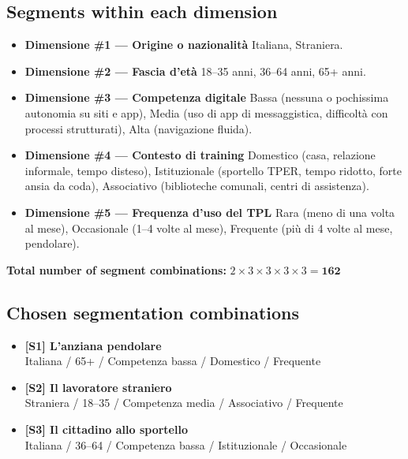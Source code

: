 \documentclass[11pt,a4paper]{article}
\begin{document}
\vspace{0.5cm}

\begin{tcolorbox}[colback=backgroundColor,colframe=borderColor,arc=2mm]
\subsection{Segments within each dimension}
\begin{itemize}[leftmargin=*,itemsep=4pt]
\item \textbf{Dimensione \#1 --- Origine o nazionalità}
    Italiana,
    Straniera.
\item \textbf{Dimensione \#2 --- Fascia d'età}
    18--35 anni,
    36--64 anni,
    65+ anni.
\item \textbf{Dimensione \#3 --- Competenza digitale}
    Bassa (nessuna o pochissima autonomia su siti e app),
    Media (uso di app di messaggistica, difficoltà con processi strutturati),
    Alta (navigazione fluida).
\item \textbf{Dimensione \#4 --- Contesto di training}
    Domestico (casa, relazione informale, tempo disteso),
    Istituzionale (sportello TPER, tempo ridotto, forte ansia da coda),
    Associativo (biblioteche comunali, centri di assistenza).
\item \textbf{Dimensione \#5 --- Frequenza d'uso del TPL}
    Rara (meno di una volta al mese),
    Occasionale (1--4 volte al mese),
    Frequente (più di 4 volte al mese, pendolare).
\end{itemize}
\end{tcolorbox}

\vspace{0.3cm}
\begin{flushleft}
\textbf{Total number of segment combinations:} \quad $2 \times 3 \times 3 \times 3 \times 3 = \mathbf{162}$
\end{flushleft}
\vspace{0.3cm}

\subsection{Chosen segmentation combinations}

\begin{tcolorbox}[colback=backgroundColor,colframe=borderColor,arc=2mm]
\begin{itemize}[leftmargin=*,itemsep=6pt]
    \item {}\label{seg:anziana} \textbf{[S1] L'anziana pendolare} \\ Italiana / 65+ / Competenza bassa / Domestico / Frequente
    \item {}\label{seg:straniero} \textbf{[S2] Il lavoratore straniero} \\ Straniera / 18--35 / Competenza media / Associativo / Frequente
    \item {}\label{seg:cittadino} \textbf{[S3] Il cittadino allo sportello} \\ Italiana / 36--64 / Competenza bassa / Istituzionale / Occasionale
\end{itemize}
\end{tcolorbox}
\end{document}
